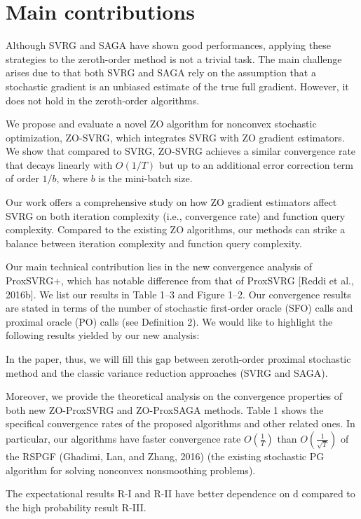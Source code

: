 \documentclass{article}
\theoremstyle{definition}
\theoremstyle{remark}
\begin{document}
\section{Main contributions}
{\color{Green}
Although SVRG and SAGA have shown good performances, applying these strategies to the zeroth-order method is not a trivial task. The main challenge arises due to that both SVRG and SAGA rely on the assumption that a
stochastic gradient is an unbiased estimate of the true full gradient. However, it does not hold in the zeroth-order algorithms. 
{\color{Brown}We propose and evaluate a novel ZO algorithm for nonconvex stochastic optimization,
ZO-SVRG, which integrates SVRG with ZO gradient estimators. We show that compared to
SVRG, ZO-SVRG achieves a similar convergence rate that decays linearly with $O(1/T)$ but up
to an additional error correction term of order $1/b$, where $b$ is the mini-batch size.

Our work offers a comprehensive study on how ZO gradient estimators affect SVRG on both iteration
complexity (i.e., convergence rate) and function query complexity. Compared to the existing ZO
algorithms, our methods can strike a balance between iteration complexity and function query
complexity.}
{\color{Violet}
Our main technical contribution lies in the new convergence analysis of ProxSVRG+,
which has notable difference from that of ProxSVRG [Reddi et al., 2016b]. We list our results in Table 1–3 and Figure 1–2. Our convergence results are stated in terms of the number of stochastic first-order oracle (SFO) calls and proximal
oracle (PO) calls (see Definition 2). We would like to highlight the following results yielded by our new analysis:
}

In the paper, thus, we will fill this gap between
zeroth-order proximal stochastic method and the classic variance reduction approaches (SVRG and SAGA).

Moreover, we provide the theoretical analysis on the convergence properties of both new ZO-ProxSVRG and ZO-ProxSAGA methods. Table 1 shows the specifical convergence rates of the proposed algorithms and other related
ones. In particular, our algorithms have faster convergence rate $O(\frac{1}{{T}})$ than $O(\frac{1}{\sqrt{T}})$ of the RSPGF (Ghadimi,
Lan, and Zhang, 2016) (the existing stochastic PG algorithm for solving nonconvex nonsmoothing problems). 

{\color{RubineRed}The expectational results R-I and R-II have better dependence on
d compared to the high probability result R-III.}

}
\end{document}
